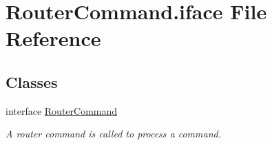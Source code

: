 \hypertarget{RouterCommand_8iface}{\section{Router\-Command.\-iface File Reference}
\label{RouterCommand_8iface}
}
\subsection*{Classes}
\begin{DoxyCompactItemize}
\item 
interface \hyperlink{interfaceRouterCommand}{Router\-Command}
\begin{DoxyCompactList}\small\item\em A router command is called to process a command. \end{DoxyCompactList}\end{DoxyCompactItemize}
